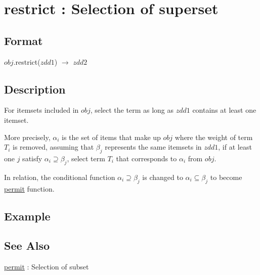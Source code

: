 
\section{restrict : Selection of superset\label{sect:restrict}}
\subsection*{Format}
$obj$.restrict($zdd1$) $\rightarrow$ $zdd2$

\subsection*{Description}
For itemsets included in $obj$, select the term as long as $zdd1$ contains at least one itemset. 

More precisely, $\alpha_i$ is the set of items that make up $obj$ where the weight of term $T_i$ is removed,   
assuming that $\beta_j$ represents the same itemsets in $zdd1$,  
if at least one $j$ satisfy $\alpha_i \supseteq \beta_j$, select term $T_i$  that corresponds to $\alpha_i$ from $obj$.

In relation, the conditional function $\alpha_i \supseteq \beta_j$ is changed to $\alpha_i \subseteq \beta_j$ to become 
\hyperref[sect:permit]{permit} function. 

\subsection*{Example}


\subsection*{See Also}
\hyperref[sect:permit]{permit} : Selection of subset
